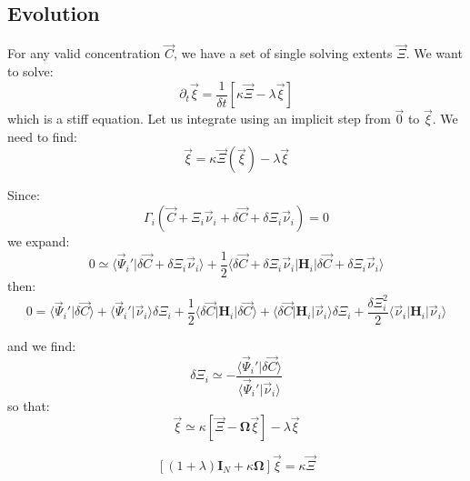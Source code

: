 \documentclass[aps,12pt]{revtex4}
\begin{document}
\subsection{Evolution}

For any valid concentration $\vec{C}$, we have a set of single solving extents $\vec{\Xi}$.
We want to solve:
\begin{equation}
	\partial_t \vec{\xi} = \dfrac{1}{\delta t} \left[ \kappa \vec{\Xi} - \lambda \vec{\xi} \right]
\end{equation}
which is a stiff equation. Let us integrate using an implicit step from $\vec{0}$ to $\vec{\xi}$.
We need to find:
\begin{equation}
	\vec{\xi} = \kappa \vec{\Xi}(\vec{\xi}) - \lambda \vec{\xi}
\end{equation}

Since:
\begin{equation}
	\Gamma_i(\vec{C} + \Xi_i \vec{\nu}_i + \delta\vec{C} + \delta\Xi_i \vec{\nu}_i) = 0
\end{equation}
we expand:
\begin{equation}
	0 \simeq \langle \vec{\Psi}_i' \vert \delta\vec{C} + \delta\Xi_i \vec{\nu}_i \rangle
	+ \dfrac{1}{2} \langle  \delta\vec{C} + \delta\Xi_i \vec{\nu}_i \vert \bm{H}_i \vert  \delta\vec{C} + \delta\Xi_i \vec{\nu}_i\rangle
\end{equation}
then:
\begin{equation}
	0 = \langle \vec{\Psi}_i' \vert \delta\vec{C}\rangle + \langle \vec{\Psi}_i' \vert \vec{\nu}_i \rangle \delta \Xi_i 
	+ \dfrac{1}{2} \langle \delta\vec{C} \vert \bm{H}_i \vert \delta\vec{C} \rangle
	+ \langle \delta\vec{C} \vert \bm{H}_i \vert \vec{\nu}_i \rangle \delta \Xi_i
	+ \dfrac{\delta\Xi_i^2}{2} \langle \vec{\nu}_i \vert \bm{H}_i \vert \vec{\nu}_i \rangle
\end{equation}


and we find:
\begin{equation}
	\delta \Xi_i \simeq - \dfrac{\langle \vec{\Psi}_i' \vert \delta\vec{C}\rangle}{\langle \vec{\Psi}_i' \vert \vec{\nu}_i \rangle}
\end{equation}
so that:
\begin{equation}
	 \vec{\xi} \simeq \kappa \left[ \vec{\Xi} - \bm{\Omega}\vec{\xi} \right] - \lambda \vec{\xi}
\end{equation} 

\begin{equation}
	\left[ (1+\lambda) \bm{I}_N + \kappa \bm{\Omega} \right] \vec{\xi} = \kappa \vec{\Xi}
\end{equation}
\end{document}
